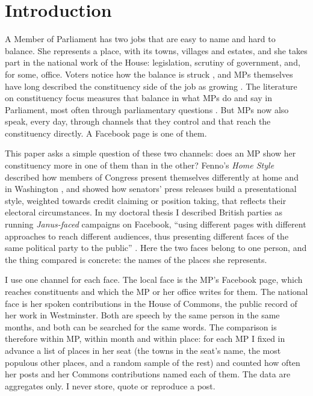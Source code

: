 \documentclass[11pt,a4paper]{article}
\begin{document}
\section{Introduction}\label{sec:intro}
A Member of Parliament has two jobs that are easy to name and hard to balance. She represents a place, with its towns, villages and estates, and she takes part in the national work of the House: legislation, scrutiny of government, and, for some, office. Voters notice how the balance is struck \citep{vivyan2016,campbell2015}, and MPs themselves have long described the constituency side of the job as growing \citep{norton1993,norton1994,searing1985}. The literature on constituency focus measures that balance in what MPs do and say in Parliament, most often through parliamentary questions \citep{martin2011,russo2011,kellermann2016,zittel2019}. But MPs now also speak, every day, through channels that they control and that reach the constituency directly. A Facebook page is one of them.

This paper asks a simple question of these two channels: does an MP show her constituency more in one of them than in the other? Fenno's \textit{Home Style} described how members of Congress present themselves differently at home and in Washington \citep{fenno1978}, and \citet{grimmer2013} showed how senators' press releases build a presentational style, weighted towards credit claiming or position taking, that reflects their electoral circumstances. In my doctoral thesis I described British parties as running \textit{Janus-faced} campaigns on Facebook, ``using different pages with different approaches to reach different audiences, thus presenting different faces of the same political party to the public'' \citep{hotham2021}. Here the two faces belong to one person, and the thing compared is concrete: the names of the places she represents.

I use one channel for each face. The local face is the MP's Facebook page, which reaches constituents and which the MP or her office writes for them. The national face is her spoken contributions in the House of Commons, the public record of her work in Westminster. Both are speech by the same person in the same months, and both can be searched for the same words. The comparison is therefore within MP, within month and within place: for each MP I fixed in advance a list of places in her seat (the towns in the seat's name, the most populous other places, and a random sample of the rest) and counted how often her posts and her Commons contributions named each of them. The data are aggregates only. I never store, quote or reproduce a post.
\end{document}
